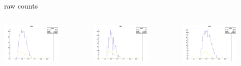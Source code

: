 \begin{frame}{raw counts}
\begin{columns}
\begin{column}[T]{0.25\textwidth}
\includegraphics[width = 0.7\textwidth]{results/yield/statistics/yield_x_Q2_z_0.40_4.000_0.50_pos.png}
\end{column}
\begin{column}[T]{0.25\textwidth}
\includegraphics[width = 0.7\textwidth]{results/yield/statistics/yield_x_Q2_z_0.40_4.000_0.50_neg.png}
\end{column}
\begin{column}[T]{0.25\textwidth}
\includegraphics[width = 0.7\textwidth]{results/yield/statistics/yield_x_Q2_z_0.40_4.000_0.60_pos.png}

\end{column}
\end{columns}
\end{frame}
